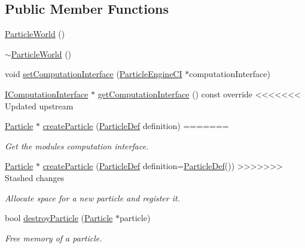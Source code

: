 \subsection*{Public Member Functions}
\begin{DoxyCompactItemize}
\item 
\mbox{\hyperlink{classr3_1_1_particle_world_a5cd4bf68559cd0e1194420d3233b095e}{Particle\+World}} ()
\item 
\mbox{\hyperlink{classr3_1_1_particle_world_a3a6d6f87b726156c41d4282c6dbb1e48}{$\sim$\+Particle\+World}} ()
\item 
void \mbox{\hyperlink{classr3_1_1_particle_world_adf5630d53659e9ced254d33990f15a9d}{set\+Computation\+Interface}} (\mbox{\hyperlink{classr3_1_1_particle_engine_c_i}{Particle\+Engine\+CI}} $\ast$computation\+Interface)
\item 
\mbox{\hyperlink{classr3_1_1_i_computation_interface}{I\+Computation\+Interface}} $\ast$ \mbox{\hyperlink{classr3_1_1_particle_world_a1e806bf89ec6445a54b9534f1efc081f}{get\+Computation\+Interface}} () const override
<<<<<<< Updated upstream
\item 
\mbox{\hyperlink{classr3_1_1_particle}{Particle}} $\ast$ \mbox{\hyperlink{classr3_1_1_particle_world_a5df8f4d242ab19e7e1a9830ef6131c3c}{create\+Particle}} (\mbox{\hyperlink{structr3_1_1_particle_def}{Particle\+Def}} definition)
=======
\begin{DoxyCompactList}\small\item\em Get the module\textquotesingle{}s computation interface. \end{DoxyCompactList}\item 
\mbox{\hyperlink{classr3_1_1_particle}{Particle}} $\ast$ \mbox{\hyperlink{classr3_1_1_particle_world_a467a56ef835bbd7c3a23b722db81fa5e}{create\+Particle}} (\mbox{\hyperlink{structr3_1_1_particle_def}{Particle\+Def}} definition=\mbox{\hyperlink{structr3_1_1_particle_def}{Particle\+Def}}())
>>>>>>> Stashed changes
\begin{DoxyCompactList}\small\item\em Allocate space for a new particle and register it. \end{DoxyCompactList}\item 
bool \mbox{\hyperlink{classr3_1_1_particle_world_a1802231868ed6d99dd677ef71328781a}{destroy\+Particle}} (\mbox{\hyperlink{classr3_1_1_particle}{Particle}} $\ast$particle)
\begin{DoxyCompactList}\small\item\em Free memory of a particle. \end{DoxyCompactList}\item 

\end{DoxyCompactItemize}
